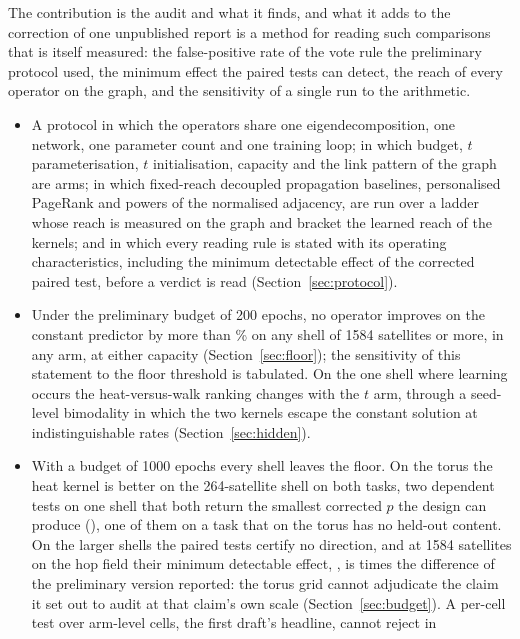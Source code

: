 \documentclass[preprint,11pt,3p]{elsarticle}
\begin{document}
The contribution is the audit and what it finds, and what it adds to the correction of one
unpublished report is a method for reading such comparisons that is itself measured: the false-positive
rate of the vote rule the preliminary protocol used, the minimum effect the paired tests can
detect, the reach of every operator on the graph, and the sensitivity of a single run to the
arithmetic.
\begin{itemize}
\item A protocol in which the operators share one eigendecomposition, one network, one parameter
  count and one training loop; in which budget, $t$ parameterisation, $t$ initialisation,
  capacity and the link pattern of the graph are arms; in which fixed-reach decoupled propagation
  baselines, personalised PageRank and powers of the normalised adjacency, are run over a ladder
  whose reach is measured on the graph and bracket the learned reach of the kernels; and in
  which every reading rule is stated with its operating characteristics, including the
  minimum detectable effect of the corrected paired test, before a verdict is read
  (Section~\ref{sec:protocol}).
\item Under the preliminary budget of 200 epochs, no operator improves on the constant predictor by
  more than \numGainLargeMax\% on any shell of 1584 satellites or more, in any arm, at either
  capacity (Section~\ref{sec:floor}); the sensitivity of this statement to the floor threshold is
  tabulated. On the one shell where learning occurs the heat-versus-walk ranking changes with the
  $t$ arm, through a seed-level bimodality in which the two kernels escape the constant solution
  at indistinguishable rates (Section~\ref{sec:hidden}).
\item With a budget of 1000 epochs every shell leaves the floor. On the torus the heat kernel is
  better on the 264-satellite shell on both tasks, two dependent tests on one shell that both
  return the smallest corrected $p$ the design can produce (\numPooledMinHolmSix), one of them
  on a task that on the torus has no held-out content. On the larger shells the paired tests
  certify no direction, and at 1584 satellites on the hop field their minimum detectable effect,
  \numPooledHopsShellOneMde, is \numMdeRatioHopsShellOne{} times the difference of
  \numPrelimDiff{} the preliminary version reported: the torus grid cannot adjudicate the claim
  it set out to audit at that claim's own scale (Section~\ref{sec:budget}). A per-cell test over
  \numGthreeArmCells{} arm-level cells, the first draft's headline, cannot reject in

\end{itemize}
\end{document}

